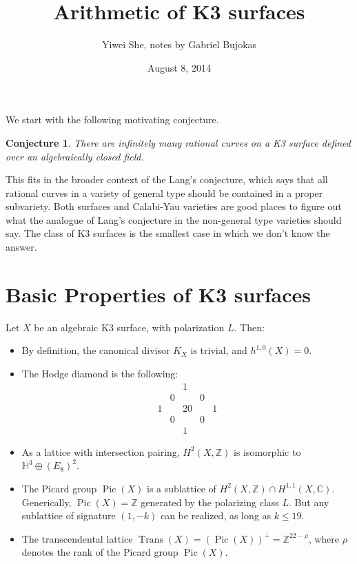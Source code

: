 \documentclass{amsart}
\title{Arithmetic of K3 surfaces}
\author{Yiwei She, notes by Gabriel Bujokas}
\date{August 8, 2014}
\theoremstyle{plain}
\newtheorem*{conjecture}{Conjecture}
\theoremstyle{definition}
\theoremstyle{remark}
\DeclareMathOperator{\Pic}{Pic}
\DeclareMathOperator{\Trans}{Trans}
\begin{document}
\maketitle

We start with the following motivating conjecture.
\begin{conjecture}
There are infinitely many rational
curves on a K3 surface defined over an algebraically closed field.
\end{conjecture}

This fits in the broader context of the Lang's conjecture, which says that all rational curves in a variety of general type should be contained in a proper subvariety. Both surfaces and Calabi-Yau varieties are good places to figure out what the analogue of Lang's conjecture in the non-general type varieties should say. 
The class of K3 surfaces is the smallest case in which we don’t know the answer.

\section{Basic Properties of K3 surfaces}
Let $X$ be an algebraic K3 surface, with polarization $L$. Then:
\begin{itemize}
	\item By definition, the canonical divisor $K_X$ is trivial, and $h^{1,0}(X)=0$.
	\item The Hodge diamond is the following:
	\[
	\begin{matrix}
	  &   & 1  &   & \\
	  & 0 &    & 0 & \\
	1 &   & 20 &   & 1 \\
	  & 0 &    & 0 & \\
	  &   &  1 &   &
	\end{matrix}
	\]
	\item As a lattice with intersection pairing, $H^2(X,\mathbb{Z})$ is isomorphic to 
	$\mathbb{H}^3 \oplus (E_8)^2$.
	\item The Picard group $\Pic(X)$ is a sublattice of 
	$H^2(X , \mathbb{Z}) \cap H^{1,1}(X ,\mathbb{C})$. Generically, $\Pic (X)= \mathbb{Z}$
	generated by the polarizing class $L$. But any sublattice of signature $(1,-k)$ can be realized,
	as long as $k \leq 19$.
	\item The transcendental lattice $\Trans(X)= \left(\Pic(X) \right)^\perp  = \mathbb{Z}^{22-\rho}$, where
	$\rho$ denotes the rank of the Picard group $\Pic(X)$.
\end{itemize}
\end{document}

